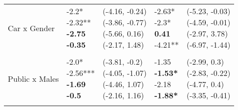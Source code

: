 \documentclass[10pt]{article}
\begin{document}
\begin{table}
\begin{center}
\begin{small}
\begin{tabular}{lllll}
\quad Car x Gender    &  \makecell[l]{\textnormal{-2.2*\phantom{**}} \\\textnormal{-2.32**\phantom{*}} \\\textbf{-2.75\phantom{***}} \\\textbf{-0.35\phantom{***}} \\}   &  \makecell[l]{\textnormal{(-4.16, -0.24)} \\\textnormal{(-3.86, -0.77)} \\\textnormal{(-5.66, 0.16)} \\\textnormal{(-2.17, 1.48)} \\}   &  \makecell[l]{\textnormal{-2.63*\phantom{**}} \\\textnormal{-2.3*\phantom{**}} \\\textbf{0.41\phantom{***}} \\\textnormal{-4.21**\phantom{*}} \\}   &  \makecell[l]{\textnormal{(-5.23, -0.03)} \\\textnormal{(-4.59, -0.01)} \\\textnormal{(-2.97, 3.78)} \\\textnormal{(-6.97, -1.44)} \\} \\ 
& & & & \\ 
\quad Public x Males    &  \makecell[l]{\textnormal{-2.0*\phantom{**}} \\\textnormal{-2.56***} \\\textbf{-1.69\phantom{***}} \\\textbf{-0.5\phantom{***}} \\}   &  \makecell[l]{\textnormal{(-3.81, -0.2)} \\\textnormal{(-4.05, -1.07)} \\\textnormal{(-4.46, 1.07)} \\\textnormal{(-2.16, 1.16)} \\}   &  \makecell[l]{\textnormal{-1.35\phantom{***}} \\\textbf{-1.53*\phantom{**}} \\\textnormal{-2.18\phantom{***}} \\\textbf{-1.88*\phantom{**}} \\}   &  \makecell[l]{\textnormal{(-2.99, 0.3)} \\\textnormal{(-2.83, -0.22)} \\\textnormal{(-4.77, 0.4)} \\\textnormal{(-3.35, -0.41)} \\} \\ 
& & & & \\ 

\end{tabular}
\end{small}
\end{center}
\end{table}
\end{document}
